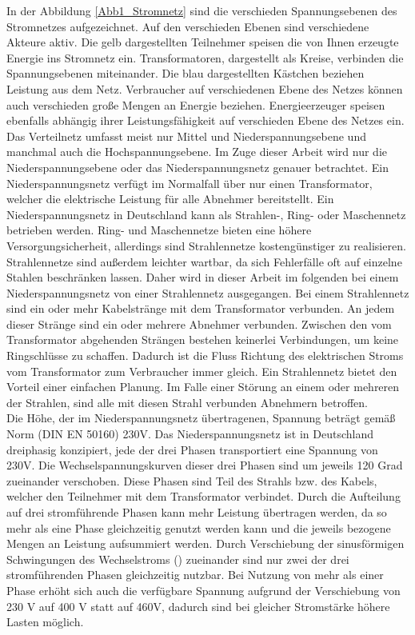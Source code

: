 In der Abbildung \ref{Abb1_Stromnetz} sind die verschieden Spannungsebenen des Stromnetzes aufgezeichnet. Auf den verschieden Ebenen sind verschiedene Akteure aktiv. Die gelb dargestellten Teilnehmer speisen die von Ihnen erzeugte Energie ins Stromnetz ein. Transformatoren, dargestellt als Kreise, verbinden die Spannungsebenen miteinander. Die blau dargestellten Kästchen beziehen Leistung aus dem Netz. Verbraucher auf verschiedenen Ebene des Netzes können auch verschieden große Mengen an Energie beziehen. Energieerzeuger speisen ebenfalls abhängig ihrer Leistungsfähigkeit auf verschieden Ebene des Netzes ein. Das Verteilnetz umfasst meist nur Mittel und Niederspannungsebene und manchmal auch die Hochspannungsebene. Im Zuge dieser Arbeit wird nur die Niederspannungsebene oder das Niederspannungsnetz genauer betrachtet. Ein Niederspannungsnetz verfügt im Normalfall über nur einen Transformator, welcher die elektrische Leistung für alle Abnehmer bereitstellt. Ein Niederspannungsnetz in Deutschland kann als Strahlen-, Ring- oder Maschennetz betrieben werden. Ring- und Maschennetze bieten eine höhere Versorgungsicherheit, allerdings sind Strahlennetze kostengünstiger zu realisieren. Strahlennetze sind außerdem leichter wartbar, da sich Fehlerfälle oft auf einzelne Stahlen beschränken lassen. Daher wird in dieser Arbeit im folgenden bei einem Niederspannungsnetz von einer Strahlennetz ausgegangen. Bei einem Strahlennetz sind ein oder mehr Kabelstränge mit dem Transformator verbunden. An jedem dieser Stränge sind ein oder mehrere Abnehmer verbunden. Zwischen den vom Transformator abgehenden Strängen bestehen keinerlei Verbindungen, um keine Ringschlüsse zu schaffen. Dadurch ist die Fluss Richtung des elektrischen Stroms vom Transformator zum Verbraucher immer gleich. Ein Strahlennetz bietet den Vorteil einer einfachen Planung. Im Falle einer Störung an einem oder mehreren der Strahlen, sind alle mit diesen Strahl verbunden Abnehmern betroffen.\\
Die Höhe, der im Niederspannungsnetz übertragenen, Spannung beträgt gemäß Norm (DIN EN 50160) 230V. Das Niederspannungsnetz ist in Deutschland dreiphasig konzipiert, jede der drei Phasen transportiert eine Spannung von 230V. Die Wechselspannungskurven dieser drei Phasen sind um jeweils 120 Grad zueinander verschoben. Diese Phasen sind Teil des Strahls bzw. des Kabels, welcher den Teilnehmer mit dem Transformator verbindet. Durch die Aufteilung auf drei stromführende Phasen kann mehr Leistung übertragen werden, da so mehr als eine Phase  gleichzeitig genutzt werden kann und die jeweils bezogene Mengen an Leistung aufsummiert werden. Durch Verschiebung der sinusförmigen Schwingungen des Wechselstroms (\cite{strom_phasen}) zueinander sind nur zwei der drei stromführenden Phasen gleichzeitig nutzbar. Bei Nutzung von mehr als einer Phase erhöht sich auch die verfügbare Spannung aufgrund der Verschiebung von 230 V auf 400 V statt auf 460V, dadurch sind bei gleicher Stromstärke höhere Lasten möglich.



